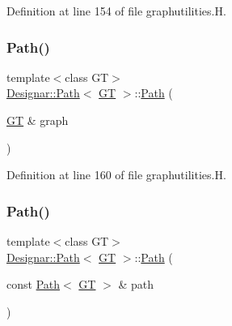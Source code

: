 Definition at line 154 of file graphutilities.\+H.

\mbox{\label{class_designar_1_1_path_a92b56646f20bdce1ed05601b983235d6}} 
\subsubsection{\texorpdfstring{Path()}{Path()}\hspace{0.1cm}{\footnotesize\ttfamily [2/4]}}
{\footnotesize\ttfamily template$<$class GT$>$ \\
\hyperlink{class_designar_1_1_path}{Designar\+::\+Path}$<$ \hyperlink{demo-buildgraph_8_c_a3001c40d2c31ca87ed96cd7d1334a55e}{GT} $>$\+::\hyperlink{class_designar_1_1_path}{Path} (\begin{DoxyParamCaption}\item[{\hyperlink{demo-buildgraph_8_c_a3001c40d2c31ca87ed96cd7d1334a55e}{GT} \&}]{graph }\end{DoxyParamCaption})\hspace{0.3cm}{\ttfamily [inline]}}



Definition at line 160 of file graphutilities.\+H.

\mbox{\label{class_designar_1_1_path_a9dc80e39b78c86740d5731899f5cb204}} 
\subsubsection{\texorpdfstring{Path()}{Path()}\hspace{0.1cm}{\footnotesize\ttfamily [3/4]}}
{\footnotesize\ttfamily template$<$class GT$>$ \\
\hyperlink{class_designar_1_1_path}{Designar\+::\+Path}$<$ \hyperlink{demo-buildgraph_8_c_a3001c40d2c31ca87ed96cd7d1334a55e}{GT} $>$\+::\hyperlink{class_designar_1_1_path}{Path} (\begin{DoxyParamCaption}\item[{const \hyperlink{class_designar_1_1_path}{Path}$<$ \hyperlink{demo-buildgraph_8_c_a3001c40d2c31ca87ed96cd7d1334a55e}{GT} $>$ \&}]{path }\end{DoxyParamCaption})\hspace{0.3cm}{\ttfamily [inline]}}



